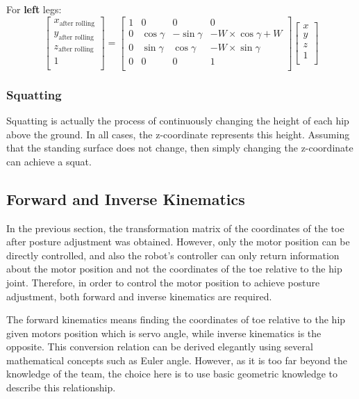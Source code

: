 For \textbf{left} legs:
\begin{equation}
   \begin{bmatrix}
   x_\text{after rolling} \\
   y_\text{after rolling} \\
   z_\text{after rolling} \\
   1                      \\
   \end{bmatrix}
   =
   \begin{bmatrix}
   1 & 0 & 0 & 0 \\
   0 & \cos\gamma & -\sin\gamma & -W \times \cos\gamma + W \\
   0 & \sin\gamma & \cos\gamma & -W \times \sin\gamma \\
   0 & 0 & 0 & 1 \\
   \end{bmatrix}
   \begin{bmatrix}
   x \\
   y \\
   z \\
   1 \\
   \end{bmatrix}
\end{equation}

\subsubsection{Squatting}

Squatting is actually the process of continuously changing the height of each hip above the ground. In all cases, the z-coordinate represents this height. Assuming that the standing surface does not change, then simply changing the z-coordinate can achieve a squat.

\subsection{Forward and Inverse Kinematics}

In the previous section, the transformation matrix of the coordinates of the toe after posture adjustment was obtained. However, only the motor position can be directly controlled, and also the robot's controller can only return information about the motor position and not the coordinates of the toe relative to the hip joint. Therefore, in order to control the motor position to achieve posture adjustment, both forward and inverse kinematics are required.

The forward kinematics means finding the coordinates of toe relative to the hip given motors position which is servo angle, while inverse kinematics is the opposite. This conversion relation can be derived elegantly using several mathematical concepts such as Euler angle. However, as it is too far beyond the knowledge of the team, the choice here is to use basic geometric knowledge to describe this relationship.

